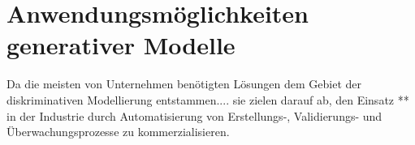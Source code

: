 \section{Anwendungsmöglichkeiten generativer Modelle}\label{Anwendungsmöglichkeiten generativer Modelle}

Da die meisten von Unternehmen benötigten Lösungen dem Gebiet der diskriminativen Modellierung entstammen.... sie zielen darauf ab, den Einsatz ** 
in der Industrie durch Automatisierung von Erstellungs-, Validierungs- und Überwachungsprozesse zu kommerzialisieren.